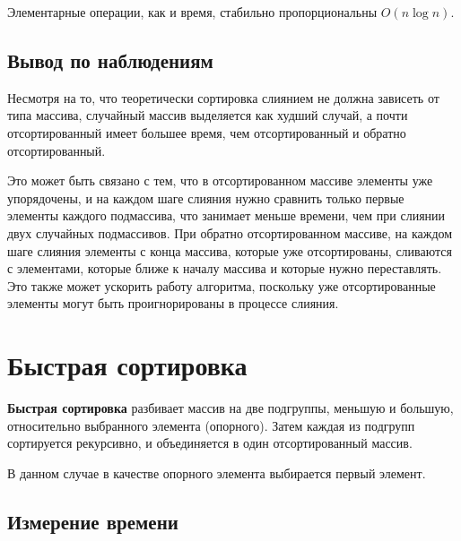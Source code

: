 \documentclass[11pt]{article}
\begin{document}
\begin{center}
\end{center}
{ \hspace*{\fill} }

Элементарные операции, как и время, стабильно пропорциональны $O(n\log n)$.

\subsection{Вывод по наблюдениям}

Несмотря на то, что теоретически сортировка слиянием не должна зависеть от типа массива,
случайный массив выделяется как худший случай, а почти отсортированный имеет большее время, чем отсортированный и обратно отсортированный.

Это может быть связано с тем, что в отсортированном массиве элементы уже упорядочены, и на каждом шаге слияния нужно сравнить только первые элементы
каждого подмассива, что занимает меньше времени, чем при слиянии двух случайных подмассивов. При обратно отсортированном массиве, на каждом шаге слияния элементы с
конца массива, которые уже отсортированы, сливаются с элементами, которые ближе к началу массива и которые нужно переставлять.
Это также может ускорить работу алгоритма, поскольку уже отсортированные элементы могут быть проигнорированы в процессе слияния.

\newpage

\setcounter{section}{10}
\section*{\centering Быстрая сортировка}

\textbf{Быстрая сортировка} разбивает массив на две подгруппы, меньшую и большую,
относительно выбранного элемента (опорного). Затем каждая из подгрупп сортируется рекурсивно, и объединяется в один отсортированный массив.

В данном случае в качестве опорного элемента выбирается первый элемент.

\setcounter{subsection}{0}
\subsection{Измерение времени}

\begin{center}
\end{center}
{ \hspace*{\fill} }
\end{document}
